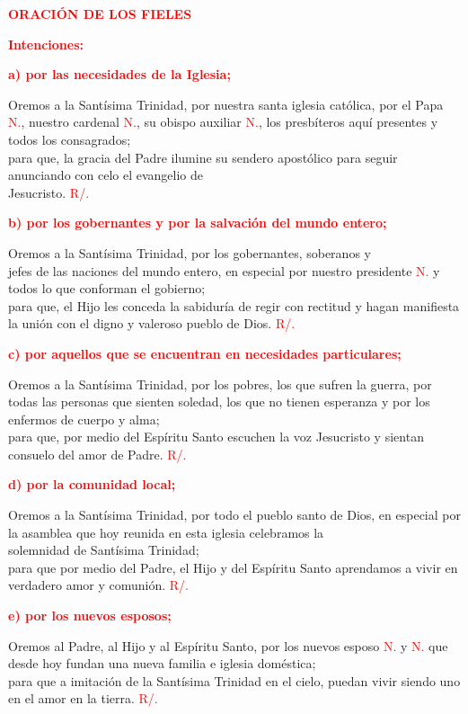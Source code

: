 \documentclass[12pt, letterpaper]{article}
\begin{document}
  \Large {\bfseries \textcolor{red}{ORACI\'ON DE LOS FIELES}}

  \large {\bfseries \textcolor{red}{Intenciones:}}

  \large {\bfseries \textcolor{red}{a) por las necesidades de la Iglesia;}}

  \Large Oremos a la Sant\'isima Trinidad, por nuestra santa iglesia cat\'olica,
  por el Papa \textcolor{red}{N.}, nuestro cardenal \textcolor{red}{N.}, 
  su obispo auxiliar \textcolor{red}{N.}, los presb\'iteros aqu\'i 
  presentes y todos los consagrados;\\
  para que, la gracia del Padre ilumine su sendero apost\'olico
  para seguir anunciando con celo el evangelio de \\
  Jesucristo. \textcolor{red}{R/.}

  \large {\bfseries \textcolor{red}{b) por los gobernantes y por la salvaci\'on del mundo entero;}}

  \Large Oremos a la Sant\'isima Trinidad, por los gobernantes, 
  soberanos y\\ jefes de las naciones del mundo entero, en especial por 
  nuestro presidente \textcolor{red}{N.} y todos lo que conforman el gobierno;\\
  para que, el Hijo les conceda la sabidur\'ia de regir con rectitud y 
  hagan manifiesta la uni\'on con el digno y valeroso pueblo de Dios.
  \textcolor{red}{R/.}

  \large {\bfseries \textcolor{red}{c) por aquellos que se encuentran en necesidades particulares;}}

  \Large Oremos a la Sant\'isima Trinidad, por los pobres, 
  los que sufren la guerra, por todas las personas que sienten soledad, 
  los que no tienen esperanza y por los enfermos de cuerpo y alma;\\
  para que, por medio del Esp\'iritu Santo escuchen la voz Jesucristo y 
  sientan consuelo del amor de Padre.
  \textcolor{red}{R/.}

  \large {\bfseries \textcolor{red}{d) por la comunidad local;}}

  \Large Oremos a la Sant\'isima Trinidad, por todo el pueblo santo de Dios, 
  en especial por la asamblea que hoy reunida en esta iglesia celebramos 
  la\\ solemnidad de Sant\'isima Trinidad;\\ 
  para que por medio del Padre, 
  el Hijo y del Esp\'iritu Santo aprendamos a vivir en verdadero amor 
  y comuni\'on. \textcolor{red}{R/.}

  \large {\bfseries \textcolor{red}{e) por los nuevos esposos;}}

  \Large Oremos al Padre, al Hijo y al Esp\'iritu Santo, 
  por los nuevos esposo \textcolor{red}{N.} y \textcolor{red}{N.} 
  que desde hoy fundan una nueva familia e iglesia dom\'estica;\\
  para que a imitaci\'on de la Sant\'isima Trinidad en el cielo, 
  puedan vivir siendo uno en el amor en la tierra. \textcolor{red}{R/.}
\end{document}
